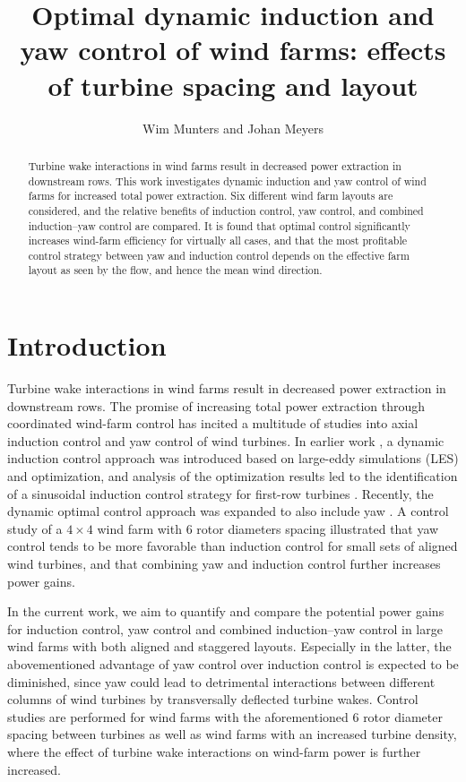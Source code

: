 \documentclass[a4paper]{jpconf}
\begin{document}
\title{Optimal dynamic induction and yaw control of wind farms: effects of turbine spacing and layout}

\author{Wim Munters and Johan Meyers}

\address{Department of Mechanical Engineering, KU Leuven, Celestijnenlaan 300A, B3001 Leuven, Belgium}


\begin{abstract}
Turbine wake interactions in wind farms result in decreased power extraction in downstream rows. This work investigates dynamic induction and yaw control of wind farms for increased total power extraction. Six different wind farm layouts are considered, and the relative benefits of induction control, yaw control, and combined induction--yaw control are compared. It is found that optimal control significantly increases wind-farm efficiency for virtually all cases, and that the most profitable control strategy between yaw and induction control depends on the effective farm layout as seen by the flow, and hence the mean wind direction. 
\end{abstract}

\section{Introduction}
Turbine wake interactions in wind farms result in decreased power extraction in downstream rows. The promise of increasing total power extraction
through coordinated wind-farm control has incited a multitude of studies into axial induction control and yaw control of wind turbines. In earlier
work \cite{goit, munters}, a dynamic induction control approach was introduced based on large-eddy simulations (LES)  and optimization, and analysis of the optimization results led to the identification of a sinusoidal induction control strategy for first-row turbines \cite{munterswes}. Recently, the dynamic optimal control approach was expanded to also include yaw \cite{muntersenergies}. A control study of a $4 \times 4$ wind farm with 6 rotor diameters spacing illustrated that yaw control tends to be more favorable than induction control for small sets of aligned wind turbines, and that combining yaw and induction control further increases power gains. 

In the current work, we aim to quantify and compare the potential power gains for induction control, yaw control and combined induction--yaw control in large wind farms with both aligned and staggered layouts. Especially in the latter, the abovementioned advantage of yaw control over induction control is expected to be diminished, since yaw could lead to detrimental interactions between different columns of wind turbines by transversally deflected turbine wakes. Control studies are performed for wind farms with the aforementioned 6 rotor diameter spacing between turbines as well as wind farms with an increased turbine density, where the effect of turbine wake interactions on wind-farm power is further increased.  
\end{document}
